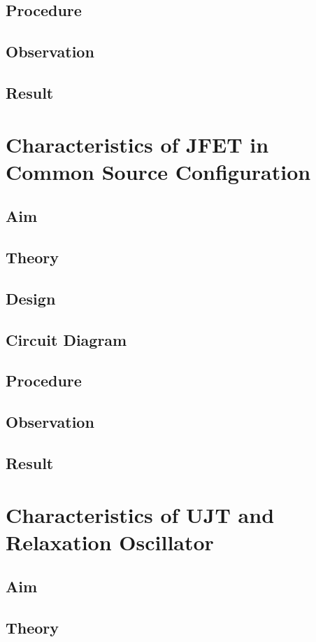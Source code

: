 \documentclass{book}
\begin{document}
\section*{Procedure}
\section*{Observation}
\section*{Result}
\chapter[Characteristics of MOSFET in Common Drain Configuration]{Characteristics of JFET in Common Source Configuration}
\section*{Aim}
\section*{Theory}
\section*{Design}
\section*{Circuit Diagram}
\section*{Procedure}
\section*{Observation}
\section*{Result}

\chapter[Characteristics of UJT and Relaxation Oscillator]{Characteristics of UJT and Relaxation Oscillator}
\section*{Aim}
\section*{Theory}
\end{document}
